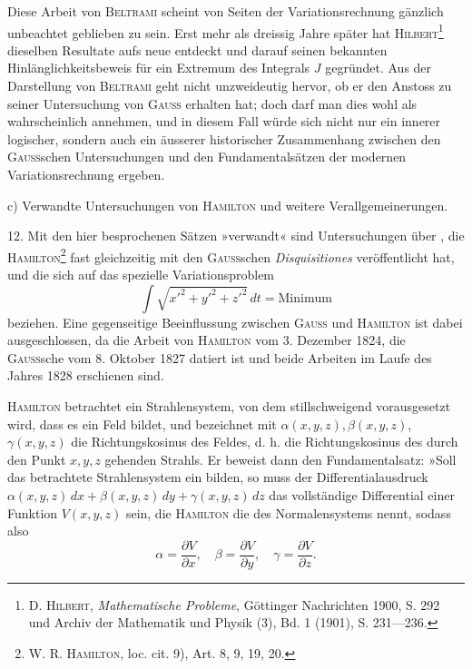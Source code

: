 Diese Arbeit von \textsc{Beltrami} scheint von Seiten der Variationsrechnung
gänzlich unbeachtet geblieben zu sein. Erst mehr als dreissig Jahre später
hat \textsc{Hilbert}\footnote{D. \textsc{Hilbert}, \textit{Mathematische Probleme}, Göttinger Nachrichten 1900, S. 292 und Archiv der Mathematik
und Physik (3), Bd. 1 (1901), S. 231—236.} dieselben Resultate aufs neue entdeckt und darauf seinen
\clearpage{}
\noindent bekannten Hinlänglichkeitsbeweis für ein Extremum des Integrals $J$ gegründet.
Aus der Darstellung von \textsc{Beltrami} geht nicht unzweideutig hervor, ob er den
Anstoss zu seiner Untersuchung von \textsc{Gauss} erhalten hat; doch darf man dies
wohl als wahrscheinlich annehmen, und in diesem Fall würde sich nicht nur
ein innerer logischer, sondern auch ein äusserer historischer Zusammenhang
zwischen den \textsc{Gauss}schen Untersuchungen und den Fundamentalsätzen der
modernen Variationsrechnung ergeben.
\par\noindent\hspace*{\parindent}c) Verwandte Untersuchungen von \textsc{Hamilton} und weitere Verallgemeinerungen.
\par\noindent\hspace*{\parindent}12. Mit den hier besprochenen Sätzen »verwandt« sind Untersuchungen
über , die \textsc{Hamilton}\footnote{W. R. \textsc{Hamilton}, loc. cit. 9), Art. 8, 9, 19, 20.} fast gleichzeitig mit den \textsc{Gauss}schen
\textit{Disquisitiones} veröffentlicht hat, und die sich auf das spezielle Variationsproblem
\[
\int\sqrt{x'^2+y'^2+z'^2}\,dt=\text{Minimum}
\]
beziehen. Eine gegenseitige Beeinflussung zwischen \textsc{Gauss} und \textsc{Hamilton} ist
dabei ausgeschlossen, da die Arbeit von \textsc{Hamilton} vom 3. Dezember 1824, die
\textsc{Gauss}sche vom 8. Oktober 1827 datiert ist und beide Arbeiten im Laufe des
Jahres 1828 erschienen sind.

\textsc{Hamilton} betrachtet ein Strahlensystem, von dem stillschweigend vorausgesetzt
wird, dass es ein Feld bildet, und bezeichnet mit $\alpha(x,y,z),\beta(x,y,z)$,
$\gamma(x,y,z)$ die Richtungskosinus des Feldes, d. h. die Richtungskosinus des durch
den Punkt $x,y,z$ gehenden Strahls. Er beweist dann den Fundamentalsatz:
»Soll das betrachtete Strahlensystem ein  bilden, so muss
der Differentialausdruck $\alpha(x,y,z)\,dx+\beta(x,y,z)\,dy+\gamma(x,y,z)\,dz$ das vollständige
Differential einer Funktion $V(x,y,z)$ sein, die \textsc{Hamilton} die  des Normalensystems nennt, sodass also
\begin{equation*}\tag{31}
\alpha=\frac{\partial V}{\partial x},\quad\beta=\frac{\partial V}{\partial y},\quad\gamma=\frac{\partial V}{\partial z}.
\end{equation*}

